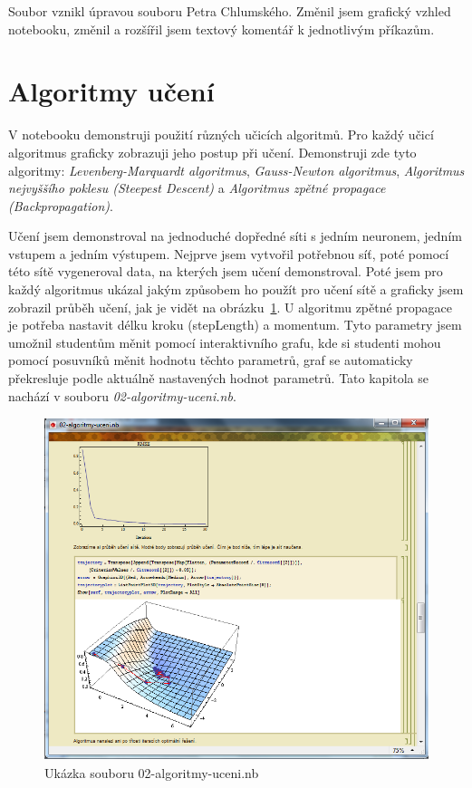 \documentclass[11pt,twoside,a4paper]{book}
\begin{document}
Soubor vznikl úpravou souboru Petra Chlumského. Změnil jsem grafický vzhled notebooku, změnil a rozšířil jsem textový komentář k jednotlivým příkazům.




\section{Algoritmy učení}
V notebooku demonstruji použití různých učicích algoritmů. Pro každý učicí algoritmus graficky zobrazuji jeho postup při učení. Demonstruji zde tyto algoritmy: \textit{Levenberg-Marquardt algoritmus}, \textit{Gauss-Newton algoritmus}, \textit{Algoritmus nejvyššího poklesu (Steepest Descent)} a \textit{Algoritmus zpětné propagace (Backpropagation)}.

Učení jsem demonstroval na jednoduché dopředné síti s jedním neuronem, jedním vstupem a jedním výstupem. Nejprve jsem vytvořil potřebnou síť, poté pomocí této sítě vygeneroval data, na kterých jsem učení demonstroval. Poté jsem pro každý algoritmus ukázal jakým způsobem ho použít pro učení sítě a graficky jsem zobrazil průběh učení, jak je vidět na obrázku~\ref{fig:algoritmy-uceni}. U algoritmu zpětné propagace je potřeba nastavit délku kroku (stepLength) a momentum. Tyto parametry jsem umožnil studentům měnit pomocí interaktivního grafu, kde si studenti mohou pomocí posuvníků měnit hodnotu těchto parametrů, graf se automaticky překresluje podle aktuálně nastavených hodnot parametrů. Tato kapitola se nachází v souboru \textit{02-algoritmy-uceni.nb}.

\begin{figure}[h!]
\begin{center}
\includegraphics[height=10cm]{figures/ukazka02.png}
\caption{Ukázka souboru 02-algoritmy-uceni.nb}
\label{fig:algoritmy-uceni}
\end{center}
\end{figure}
\newpage
\end{document}
